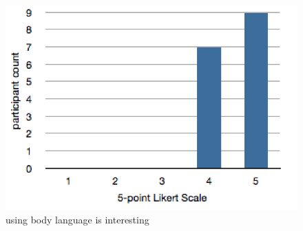 \documentclass{chi-ext}
\begin{document}

\begin{figure}
  \centering
  \includegraphics[width=0.8\linewidth]{figures/1_BLisInteresting.png}
  \caption{using body language is interesting}
  \label{fig:1_BLisInteresting}
\end{figure}
\end{document}
